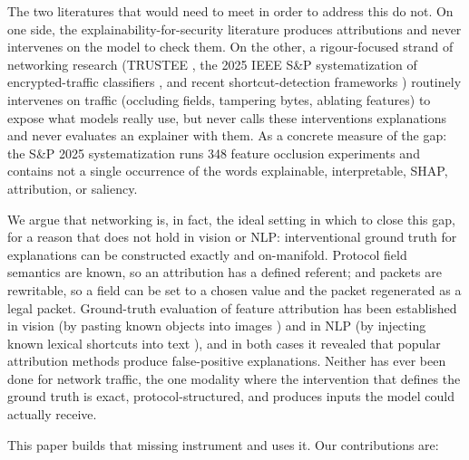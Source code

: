 \documentclass[journal]{IEEEtran}
\begin{document}
The two literatures that would need to meet in order to address this do
not. On one side, the explainability-for-security literature produces
attributions and never intervenes on the model to check them. On the
other, a rigour-focused strand of networking research (TRUSTEE
\cite{jacobs2022trustee}, the 2025 IEEE S\&P systematization of
encrypted-traffic classifiers \cite{wickramasinghe2025sok}, and recent
shortcut-detection frameworks
\cite{wang2026biasseeker,zhao2026shortcutcatcher}) routinely intervenes
on traffic (occluding fields, tampering bytes, ablating features) to
expose what models really use, but never calls these interventions
explanations and never evaluates an explainer with them. As a concrete
measure of the gap: the S\&P 2025 systematization runs 348 feature
occlusion experiments and contains not a single occurrence of the words
explainable, interpretable, SHAP, attribution, or saliency.

We argue that networking is, in fact, the ideal setting in which to
close this gap, for a reason that does not hold in vision or NLP:
interventional ground truth for explanations can be constructed exactly
and on-manifold. Protocol field semantics are known, so an attribution
has a defined referent; and packets are rewritable, so a field can be
set to a chosen value and the packet regenerated as a legal packet.
Ground-truth evaluation of feature attribution has been established in
vision (by pasting known objects into images \cite{yang2019bam}) and in
NLP (by injecting known lexical shortcuts into text
\cite{bastings2022shortcuts}), and in both cases it revealed that
popular attribution methods produce false-positive explanations. Neither
has ever been done for network traffic, the one modality where the
intervention that defines the ground truth is exact,
protocol-structured, and produces inputs the model could actually
receive.

This paper builds that missing instrument and uses it. Our contributions
are:
\end{document}
